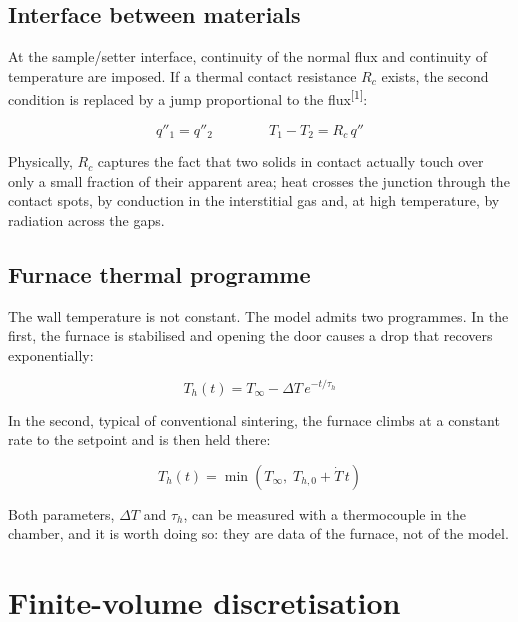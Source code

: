 \documentclass[11pt,a4paper]{article}
\newcommand{\cita}[1]{\textsuperscript{[\textcolor{uji}{#1}]}}
\begin{document}
\subsection{Interface between materials}

At the sample/setter interface, continuity of the normal flux and
continuity of temperature are imposed. If a thermal contact resistance
$R_{c}$ exists, the second condition is replaced by a jump proportional to
the flux\cita{1}:

\begin{equation}
q''_{1} = q''_{2}
\qquad\qquad
T_{1} - T_{2} = R_{c}\, q''
\end{equation}

Physically, $R_{c}$ captures the fact that two solids in contact actually
touch over only a small fraction of their apparent area; heat crosses the
junction through the contact spots, by conduction in the interstitial gas
and, at high temperature, by radiation across the gaps.

\subsection{Furnace thermal programme}

The wall temperature is not constant. The model admits two programmes. In
the first, the furnace is stabilised and opening the door causes a drop
that recovers exponentially:

\begin{equation}
T_{h}(t) = T_{\infty} - \Delta T\, e^{-t/\tau_{h}}
\end{equation}

In the second, typical of conventional sintering, the furnace climbs at a
constant rate to the setpoint and is then held there:

\begin{equation}
T_{h}(t) = \min\left( T_{\infty},\; T_{h,0} + \dot{T}\, t \right)
\end{equation}

Both parameters, $\Delta T$ and $\tau_{h}$, can be measured with a
thermocouple in the chamber, and it is worth doing so: they are data of the
furnace, not of the model.

\section{Finite-volume discretisation}
\end{document}
